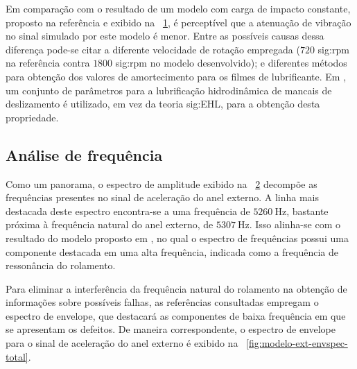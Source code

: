 \documentclass[12pt,oneside,english,brazil,lmodern,siglas,simbolos,cite=num]{ucsmonograph}
\begin{document}
	Em comparação com o resultado de um modelo com carga de impacto constante, proposto na referência \cite{sassi:2007} e exibido na \figurename\ \ref{fig:resposta-tempo-sassi}, é perceptível que a atenuação de vibração no sinal simulado por este modelo é menor.
	Entre as possíveis causas dessa diferença pode-se citar a diferente velocidade de rotação empregada ($720$ \gls{sig:rpm} na referência contra $1800$ \gls{sig:rpm} no modelo desenvolvido);
	e diferentes métodos para obtenção dos valores de amortecimento para os filmes de lubrificante.
	Em \cite{sassi:2007}, um conjunto de parâmetros para a lubrificação hidrodinâmica de mancais de deslizamento é utilizado, em vez da teoria \gls{sig:EHL}, para a obtenção desta propriedade.
	
	\begin{figure}[t]
		\label{fig:resposta-tempo-sassi}
	\end{figure}
	
	\subsection{Análise de frequência}
	Como um panorama, o espectro de amplitude exibido na \figurename\ \ref{fig:modelo-ext-ampspec} decompõe as frequências presentes no sinal de aceleração do anel externo.
	A linha mais destacada deste espectro encontra-se a uma frequência de $5260\ \text{Hz}$, bastante próxima à frequência natural do anel externo, de $5307\ \text{Hz}$.
	Isso alinha-se com o resultado do modelo proposto em \cite{sassi:2007}, no qual o espectro de frequências possui uma componente destacada em uma alta frequência, indicada como a frequência de ressonância do rolamento.
	
	\begin{figure}[ht]
		\label{fig:modelo-ext-ampspec}
	\end{figure}

	Para eliminar a interferência da frequência natural do rolamento na obtenção de informações sobre possíveis falhas, as referências consultadas empregam o espectro de envelope, que destacará as componentes de baixa frequência em que se apresentam os defeitos.
	De maneira correspondente, o espectro de envelope para o sinal de aceleração do anel externo é exibido na \figurename\ \ref{fig:modelo-ext-envspec-total}.
\end{document}
